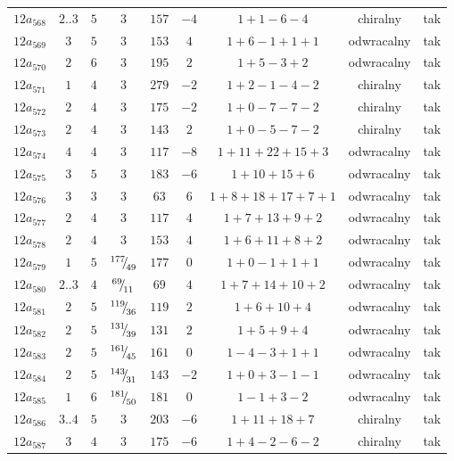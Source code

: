 \begin{longtable}{ccccccccc}
$12a_{568}$ & $2..3$ & $5$ & $3$ & $157$ & $-4$ & $1+1-6-4$ & chiralny & tak \\
$12a_{569}$ & $3$ & $5$ & $3$ & $153$ & $4$ & $1+6-1+1+1$ & odwracalny & tak \\
$12a_{570}$ & $2$ & $6$ & $3$ & $195$ & $2$ & $1+5-3+2$ & odwracalny & tak \\
$12a_{571}$ & $1$ & $4$ & $3$ & $279$ & $-2$ & $1+2-1-4-2$ & chiralny & tak \\
$12a_{572}$ & $2$ & $4$ & $3$ & $175$ & $-2$ & $1+0-7-7-2$ & chiralny & tak \\
$12a_{573}$ & $2$ & $4$ & $3$ & $143$ & $2$ & $1+0-5-7-2$ & chiralny & tak \\
$12a_{574}$ & $4$ & $4$ & $3$ & $117$ & $-8$ & $1+11+22+15+3$ & odwracalny & tak \\
$12a_{575}$ & $3$ & $5$ & $3$ & $183$ & $-6$ & $1+10+15+6$ & odwracalny & tak \\
$12a_{576}$ & $3$ & $3$ & $3$ & $63$ & $6$ & $1+8+18+17+7+1$ & odwracalny & tak \\
$12a_{577}$ & $2$ & $4$ & $3$ & $117$ & $4$ & $1+7+13+9+2$ & odwracalny & tak \\
$12a_{578}$ & $2$ & $4$ & $3$ & $153$ & $4$ & $1+6+11+8+2$ & odwracalny & tak \\
$12a_{579}$ & $1$ & $5$ & ${}^{177}{\mskip -5mu/\mskip -3mu}_{49}$ & $177$ & $0$ & $1+0-1+1+1$ & odwracalny & tak \\
$12a_{580}$ & $2..3$ & $4$ & ${}^{69}{\mskip -5mu/\mskip -3mu}_{11}$ & $69$ & $4$ & $1+7+14+10+2$ & odwracalny & tak \\
$12a_{581}$ & $2$ & $5$ & ${}^{119}{\mskip -5mu/\mskip -3mu}_{36}$ & $119$ & $2$ & $1+6+10+4$ & odwracalny & tak \\
$12a_{582}$ & $2$ & $5$ & ${}^{131}{\mskip -5mu/\mskip -3mu}_{39}$ & $131$ & $2$ & $1+5+9+4$ & odwracalny & tak \\
$12a_{583}$ & $2$ & $5$ & ${}^{161}{\mskip -5mu/\mskip -3mu}_{45}$ & $161$ & $0$ & $1-4-3+1+1$ & odwracalny & tak \\
$12a_{584}$ & $2$ & $5$ & ${}^{143}{\mskip -5mu/\mskip -3mu}_{31}$ & $143$ & $-2$ & $1+0+3-1-1$ & odwracalny & tak \\
$12a_{585}$ & $1$ & $6$ & ${}^{181}{\mskip -5mu/\mskip -3mu}_{50}$ & $181$ & $0$ & $1-1+3-2$ & odwracalny & tak \\
$12a_{586}$ & $3..4$ & $5$ & $3$ & $203$ & $-6$ & $1+11+18+7$ & chiralny & tak \\
$12a_{587}$ & $3$ & $4$ & $3$ & $175$ & $-6$ & $1+4-2-6-2$ & chiralny & tak \\

\end{longtable}
